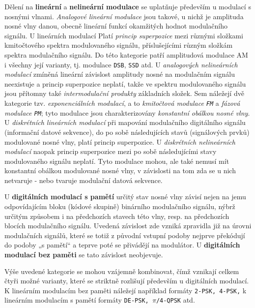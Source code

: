       Dělení na \textbf{lineární} a \textbf{nelineární modulace} se uplatňuje především u modulací 
      s nosnými vlnami. \emph{Analogové lineární modulace} jsou takové, u nichž je amplituda nosné 
      vlny danou, obecně lineární funkcí okamžitých hodnot modulačního signálu. U lineárních 
      modulací Platí \emph{princip superpozice} mezi různými složkami kmitočtového spektra 
      modulovaného signálu, příslušejícími různým složkám spektra modulačního signálu. Do této 
      kategorie patří amplitudová modulace AM i všechny její varianty, tj. modulace \texttt{DSB}, 
      \texttt{SSD} atd. U \emph{analogových nelineárních modulací} zmíněná lineární závislost 
      amplitudy nosné na modulačním signálu neexistuje a princip superpozice neplatí, takže ve 
      spektru modulovaného 
      signálu jsou přítomny také \emph{intermodulační produkty} základních složek. Sem náležejí dvě 
      kategorie tzv. \emph{exponenciálních modulací}, a to \emph{kmitočtová modulace \texttt{FM}} a 
      \emph{fázová modulace \texttt{PM}}; tyto modulace jsou charakterizovány \emph{konstantní 
      obálkou nosné vlny}. U \emph{diskrétních lineárních modulací} při mapování modulačního 
      digitálního signálu (informační datové sekvence), do po sobě následujících stavů (signálových 
      prvků) modulované nosné vlny, platí princip superpozice. U \emph{diskrétních nelineárních 
      modulací} naopak princip superpozice mezi po sobě následujícími stavy modulovaného signálu 
      neplatí. Tyto   modulace mohou, ale také nemusí mít konstantní obálkou modulované nosné vlny, 
      v závislosti na tom zda se u nich netvaruje - nebo tvaruje modulační datová sekvence.
      
      U \textbf{digitálních modulací s pamětí} určitý stav nosné vlny závisí nejen na jemu 
      odpovídajícím bloku (kódové skupině) binárního modulačního signálu, nýbrž určitým způsobem i 
      na předchozích stavech této vlny, resp. na předchozích blocích modulačního signálu. Uvedená 
      závislost zde vzniká zpravidla již na úrovni modulačních signálů, které se totiž z původní 
      vstupní podoby nejprve překódují do podoby „s pamětí“ a teprve poté se přivádějí na 
      modulátor. U \textbf{digitálních modulací bez paměti} se tato závislost neobjevuje.
      
      Výše uvedené kategorie se mohou vzájemně kombinovat, čímž vznikají celkem čtyři možné 
      varianty, které se striktně rozlišují především u digitálních modulací. K lineárním modulacím 
      bez paměti náležejí například formáty \texttt{2-PSK, 4-PSK,} k lineárním modulacím s pamětí 
      formáty \texttt{DE-PSK, \(\pi\)/4-QPSK} atd. 
      
